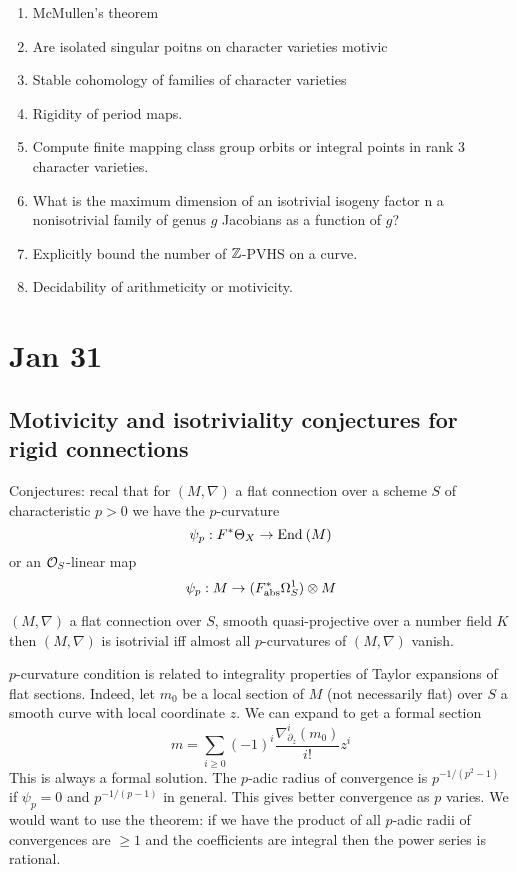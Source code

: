 \documentclass[12pt]{article}
\begin{document}
\begin{enumerate}
\item McMullen's theorem
\item Are isolated singular poitns on character varieties motivic
\item Stable cohomology of families of character varieties
\item Rigidity of period maps.
\item Compute finite mapping class group orbits or integral points in rank $3$ character varieties.
\item What is the maximum dimension of an isotrivial isogeny factor n a nonisotrivial family of genus $g$ Jacobians as a function of $g$?
\item Explicitly bound the number of $\mathbb{Z}$-PVHS on a curve.
\item Decidability of arithmeticity or motivicity.
\end{enumerate}

\section{Jan 31}

\subsection{Motivicity and isotriviality conjectures for rigid connections}

Conjectures: recal that for $(M, \nabla)$ a flat connection over a scheme $S$ of characteristic $p > 0$ we have the $p$-curvature 
\[ \psi_p : F^* \Theta_X \to \mathrm{End}_{} \left( M \right) \]
or an $\mathcal{O}_{S}$-linear map
\[ \psi_p : M \to (F^*_{\mathrm{abs}} \Omega_S^1) \otimes M \]

\begin{conj}
$(M, \nabla)$ a flat connection over $S$, smooth quasi-projective over a number field $K$ then $(M, \nabla)$ is isotrivial iff almost all $p$-curvatures of $(M, \nabla)$ vanish. 
\end{conj}

\begin{rmk}
$p$-curvature condition is related to integrality properties of Taylor expansions of flat sections. Indeed, let $m_0$ be a local section of $M$ (not necessarily flat) over $S$ a smooth curve with local coordinate $z$. We can expand to get a formal section
\[ m = \sum_{i \ge 0} (-1)^i \frac{\nabla_{\partial_z}^i (m_0)}{i!} z^i \]
This is always a formal solution. 
The $p$-adic radius of convergence is $p^{-1/(p^2-1)}$ if $\psi_p = 0$ and $p^{-1/(p-1)}$ in general. This gives better convergence as $p$ varies. We would want to use the theorem: if we have the product of all $p$-adic radii of convergences are $\ge 1$ and the coefficients are integral then the power series is rational. 
\end{rmk}
\end{document}
